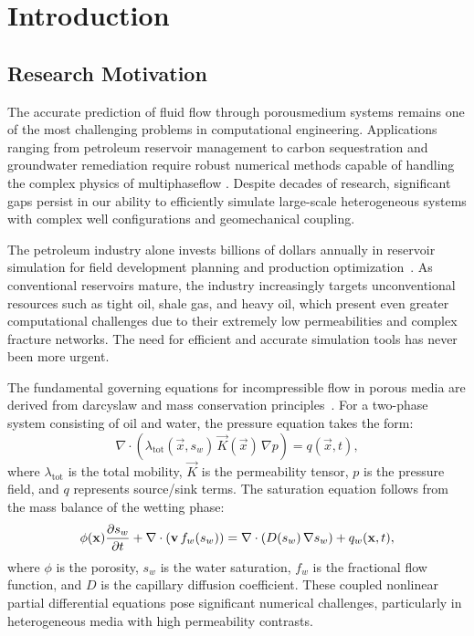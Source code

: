 \chapter{Introduction}
\label{ch:introduction}

\section{Research Motivation}
\label{sec:introduction:motivation}

The accurate prediction of fluid flow through \gls{porousmedium} systems remains one of the most challenging problems in computational engineering. Applications ranging from petroleum reservoir management to carbon sequestration and groundwater remediation require robust numerical methods capable of handling the complex physics of \gls{multiphaseflow} \cite{einstein1905, mollenhauerHandbuchDieselmotoren2007}. Despite decades of research, significant gaps persist in our ability to efficiently simulate large-scale heterogeneous systems with complex well configurations and geomechanical coupling.

The petroleum industry alone invests billions of dollars annually in reservoir simulation for field development planning and production optimization~\cite{dubbelTaschenbuchFurMaschinenbau2007}. As conventional reservoirs mature, the industry increasingly targets unconventional resources such as tight oil, shale gas, and heavy oil, which present even greater computational challenges due to their extremely low permeabilities and complex fracture networks. The need for efficient and accurate simulation tools has never been more urgent.

The fundamental governing equations for incompressible flow in porous media are derived from \gls{darcyslaw} and mass conservation principles~\cite{dubbelTaschenbuchFurMaschinenbau2007}. For a two-phase system consisting of oil and water, the pressure equation takes the form:
\begin{equation}
    \nabla \cdot \left( \lambda_{\text{tot}}(\vec{x}, s_w) \, \vec{K}(\vec{x}) \, \nabla p \right) = q(\vec{x}, t),
    \label{eq:pressure}
\end{equation}
where $\lambda_{\text{tot}}$ is the total mobility, $\vec{K}$ is the permeability tensor, $p$ is the pressure field, and $q$ represents source/sink terms. The saturation equation follows from the mass balance of the wetting phase:
\begin{equation}
    \phi(\mathbf{x}) \frac{\partial s_w}{\partial t} + \nabla \cdot \left( \mathbf{v} \, f_w(s_w) \right) = \nabla \cdot \left( D(s_w) \, \nabla s_w \right) + q_w(\mathbf{x}, t),
    \label{eq:saturation}
\end{equation}
where $\phi$ is the porosity, $s_w$ is the water saturation, $f_w$ is the fractional flow function, and $D$ is the capillary diffusion coefficient. These coupled nonlinear partial differential equations pose significant numerical challenges, particularly in heterogeneous media with high permeability contrasts.

